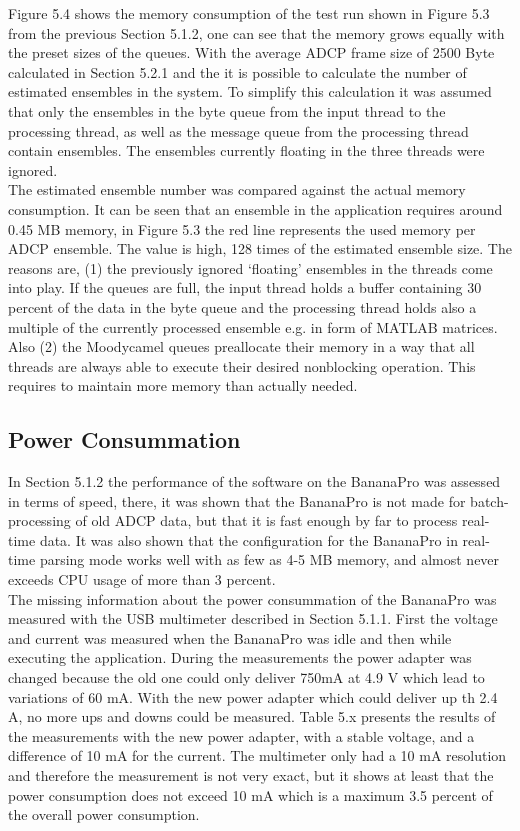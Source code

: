 Figure 5.4 shows the memory consumption of the test run shown in Figure 5.3 from the previous Section 5.1.2, one can see that the memory grows equally with the preset sizes of the queues. With the average ADCP frame size of 2500 Byte calculated in Section 5.2.1 and the  it is possible to calculate the number of estimated ensembles in the system. To simplify this calculation it was assumed that only the ensembles in the byte queue from the input thread to the processing thread, as well as the message queue from the processing thread contain ensembles. The ensembles currently floating in the three threads were ignored.\\
The estimated ensemble number was compared against the actual memory consumption. It can be seen that an ensemble in the application requires around 0.45 MB memory, in Figure 5.3 the red line represents the used memory per ADCP ensemble. The value is high, 128 times of the estimated ensemble size. The reasons are, (1) the previously ignored `floating' ensembles in the threads come into play. If the queues are full, the input thread holds a buffer containing 30 percent of the data in the byte queue and the processing thread holds also a multiple of the currently processed ensemble e.g. in form of MATLAB matrices. Also (2) the Moodycamel queues preallocate their memory in a way that all threads are always able to execute their desired nonblocking operation. This requires to maintain more memory than actually needed. 

\subsection{Power Consummation}
In Section 5.1.2 the performance of the software on the BananaPro was assessed in terms of speed, there, it was shown that the BananaPro is not made for batch-processing of old ADCP data, but that it is fast enough by far to process real-time data. It was also shown that the configuration for the BananaPro in real-time parsing mode works well with as few as 4-5 MB memory, and almost never exceeds CPU usage of more than 3 percent.\\ 
The missing information about the power consummation of the BananaPro was measured with the USB multimeter described in Section 5.1.1. First the voltage and current was measured when the BananaPro was idle and then while executing the application. During the measurements the power adapter was changed because the old one could only deliver 750mA at 4.9 V which lead to variations of 60 mA. With the new power adapter which could deliver up th 2.4 A, no more ups and downs could be measured. Table 5.x presents the results of the measurements with the new power adapter, with a stable voltage, and a difference of 10 mA for the current. The multimeter only had a 10 mA resolution and therefore the measurement is not very exact, but it shows at least that the power consumption does not exceed 10 mA which is a maximum 3.5 percent of the overall power consumption.

